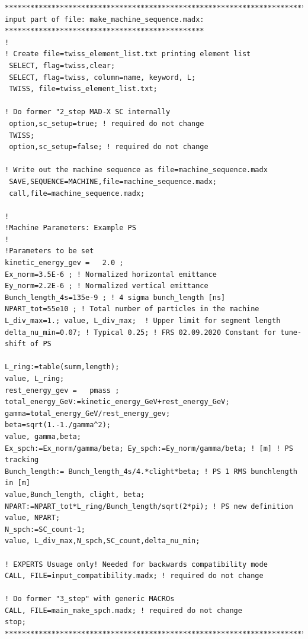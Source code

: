 \begin{verbatim}
*****************************************************************************
input part of file: make_machine_sequence.madx:
***********************************************
!
! Create file=twiss_element_list.txt printing element list
 SELECT, flag=twiss,clear;
 SELECT, flag=twiss, column=name, keyword, L;
 TWISS, file=twiss_element_list.txt;

! Do former "2_step MAD-X SC internally
 option,sc_setup=true; ! required do not change
 TWISS;
 option,sc_setup=false; ! required do not change

! Write out the machine sequence as file=machine_sequence.madx
 SAVE,SEQUENCE=MACHINE,file=machine_sequence.madx;
 call,file=machine_sequence.madx;

!
!Machine Parameters: Example PS
!
!Parameters to be set
kinetic_energy_gev =   2.0 ;
Ex_norm=3.5E-6 ; ! Normalized horizontal emittance
Ey_norm=2.2E-6 ; ! Normalized vertical emittance
Bunch_length_4s=135e-9 ; ! 4 sigma bunch_length [ns]
NPART_tot=55e10 ; ! Total number of particles in the machine
L_div_max=1.; value, L_div_max;  ! Upper limit for segment length
delta_nu_min=0.07; ! Typical 0.25; ! FRS 02.09.2020 Constant for tune-shift of PS

L_ring:=table(summ,length);
value, L_ring;
rest_energy_gev =   pmass ;
total_energy_GeV:=kinetic_energy_GeV+rest_energy_GeV;
gamma=total_energy_GeV/rest_energy_gev;
beta=sqrt(1.-1./gamma^2);
value, gamma,beta;
Ex_spch:=Ex_norm/gamma/beta; Ey_spch:=Ey_norm/gamma/beta; ! [m] ! PS tracking
Bunch_length:= Bunch_length_4s/4.*clight*beta; ! PS 1 RMS bunchlength in [m]
value,Bunch_length, clight, beta;
NPART:=NPART_tot*L_ring/Bunch_length/sqrt(2*pi); ! PS new definition
value, NPART;
N_spch:=SC_count-1;
value, L_div_max,N_spch,SC_count,delta_nu_min;

! EXPERTS Usuage only! Needed for backwards compatibility mode
CALL, FILE=input_compatibility.madx; ! required do not change

! Do former "3_step" with generic MACROs
CALL, FILE=main_make_spch.madx; ! required do not change
stop;
*****************************************************************************
\end{verbatim}

